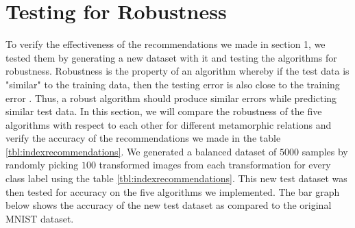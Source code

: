 \section{Testing for Robustness}
To verify the effectiveness of the recommendations we made in section 1, we tested them by generating a new dataset with it and testing the algorithms for robustness. Robustness is the property of an algorithm whereby if the test data is "similar" to the training data, then the testing error is also close to the training error \cite{Xu2012}. Thus, a robust algorithm should produce similar errors while predicting similar test data. In this section, we will compare the robustness of the five algorithms with respect to each other for different metamorphic relations and verify the accuracy of the recommendations we made in the table \ref{tbl:indexrecommendations}. We generated a balanced dataset of $5000$ samples by randomly picking $100$ transformed images from each transformation for every class label using the table \ref{tbl:indexrecommendations}. This new test dataset was then tested for accuracy on the five algorithms we implemented. The bar graph below shows the accuracy of the new test dataset as compared to the original MNIST dataset.

\Robustness
    
